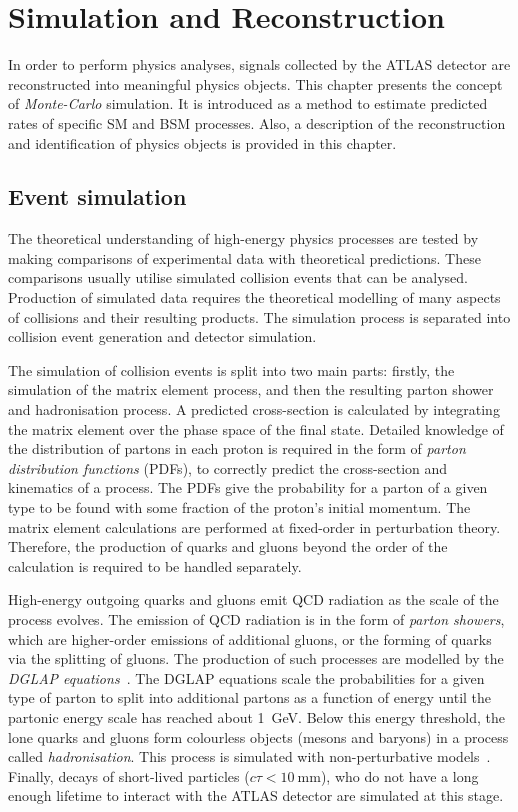 \chapter{Simulation and Reconstruction}\label{chap:SimReco}
In order to perform physics analyses, signals collected by the ATLAS detector are reconstructed into meaningful physics objects. This chapter presents the concept of \emph{Monte-Carlo} simulation. It is introduced as a method to estimate predicted rates of specific SM and BSM processes. Also, a description of the reconstruction and identification of physics objects is provided in this chapter. 

\section{Event simulation}\label{sec:simulation}
The theoretical understanding of high-energy physics processes are tested by making comparisons of experimental data with theoretical predictions. These comparisons usually utilise simulated collision events that can be analysed. Production of simulated data requires the theoretical modelling of many aspects of \protonproton collisions and their resulting products. The simulation process is separated into collision event generation and detector simulation.

The simulation of collision events is split into two main parts: firstly, the simulation of the matrix element process, and then the resulting parton shower and hadronisation process. A predicted cross-section is calculated by integrating the matrix element over the phase space of the final state. Detailed knowledge of the distribution of partons in each proton is required in the form of \emph{parton distribution functions} (PDFs), to correctly predict the cross-section and kinematics of a process. The PDFs give the probability for a parton of a given type to be found with some fraction of the proton's initial momentum. The matrix element calculations are performed at fixed-order in perturbation theory. Therefore, the production of quarks and gluons beyond the order of the calculation is required to be handled separately. 

High-energy outgoing quarks and gluons emit QCD radiation as the scale of the process evolves. The emission of QCD radiation is in the form of \emph{parton showers}, which are higher-order emissions of additional gluons, or the forming of quarks via the splitting of gluons. The production of such processes are modelled by the \emph{DGLAP equations}~\cite{Dokshitzer77,Gribov72,Altarelli77}. The DGLAP equations scale the probabilities for a given type of parton to split into additional partons as a function of energy until the partonic energy scale has reached about \SI{1}{\giga\electronvolt}. Below this energy threshold, the lone quarks and gluons form colourless objects (mesons and baryons) in a process called \emph{hadronisation}.  This process is simulated with non-perturbative models~\cite{Andersson1983,Webber1984}. Finally, decays of short-lived particles ($c\tau<\SI{10}{\milli\metre}$), who do not have a long enough lifetime to interact with the ATLAS detector are simulated at this stage. 

